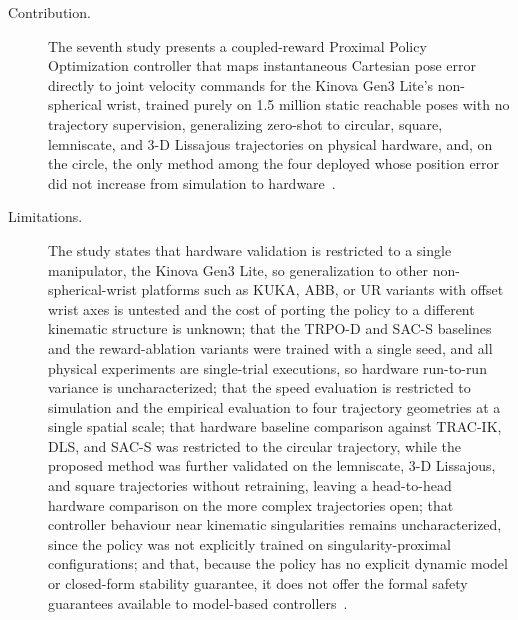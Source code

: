 \begin{description}
    \item[Contribution.] The seventh study presents a coupled-reward Proximal Policy Optimization
    controller that maps instantaneous Cartesian pose error directly to joint velocity commands for
    the Kinova Gen3 Lite's non-spherical wrist, trained purely on 1.5 million static reachable poses
    with no trajectory supervision, generalizing zero-shot to circular, square, lemniscate, and 3-D
    Lissajous trajectories on physical hardware, and, on the circle, the only method among the four
    deployed whose position error did not increase from simulation to hardware~\citep{sk2025diktracking}.

    \item[Limitations.] The study states that hardware validation is restricted to a single
    manipulator, the Kinova Gen3 Lite, so generalization to other non-spherical-wrist platforms such
    as KUKA, ABB, or UR variants with offset wrist axes is untested and the cost of porting the
    policy to a different kinematic structure is unknown; that the TRPO-D and SAC-S baselines and the
    reward-ablation variants were trained with a single seed, and all physical experiments are
    single-trial executions, so hardware run-to-run variance is uncharacterized; that the speed
    evaluation is restricted to simulation and the empirical evaluation to four trajectory
    geometries at a single spatial scale; that hardware baseline comparison against TRAC-IK, DLS, and SAC-S was restricted to
    the circular trajectory, while the proposed method was further validated on the lemniscate,
    3-D Lissajous, and square trajectories without retraining, leaving a head-to-head hardware
    comparison on the more complex trajectories open; that controller behaviour near kinematic
    singularities remains uncharacterized, since the policy was not explicitly trained on
    singularity-proximal configurations; and that, because the policy has no explicit dynamic model
    or closed-form stability guarantee, it does not offer the formal safety guarantees available to
    model-based controllers~\citep{sk2025diktracking}.


\end{description}
